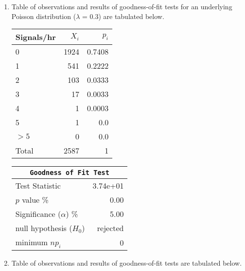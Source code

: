 \begin{enumerate}
\begin{table}[H]
\begin{minipage}{0.4\textwidth}
		\end{minipage}
	\end{table}
	\bigskip
	
	\item Table of observations and results of goodness-of-fit tests for an underlying Poisson distribution ($\lambda$ = 0.3) are tabulated below.
	
	\begin{table}[H]
		\centering
		\begin{minipage}{0.4\textwidth}
			\centering
			\begin{tabular}{@{}lrr@{}}
				\toprule
				Signals/hr & $X_i$ &   $p_i$ \\
				\midrule
				0     &  1924 &  0.7408 \\
				1     &   541 &  0.2222 \\
				2     &   103 &  0.0333 \\
				3     &    17 &  0.0033 \\
				4     &     1 &  0.0003 \\
				5     &     1 &     0.0 \\
				$ >5 $    &     0 &     0.0 \\
				\midrule
				Total &  2587 &       1 \\
				\bottomrule
			\end{tabular}
			
		\end{minipage}
		\begin{minipage}{0.4\textwidth}
			\centering
			\begin{tabular}{@{}lr@{}}
				\toprule
				\multicolumn{2}{c}{\texttt{Goodness of Fit Test}} \\
				\midrule
				Test Statistic             &  3.74e+01 \\
				$p$ value \%               &      0.00 \\
				Significance ($\alpha$) \% &      5.00 \\
				null hypothesis ($H_0$)    &  rejected \\
				minimum $n p_i$            &         0 \\
				\bottomrule
			\end{tabular}
			
		\end{minipage}
	\end{table}
	\bigskip
	
	\item Table of observations and results of goodness-of-fit tests are tabulated below.
	

\end{enumerate}
